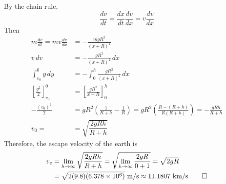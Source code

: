\begin{solution}
    By the chain rule,
    \[\frac{dv}{dt}=\frac{dx}{dt}\frac{dv}{dx}=v\frac{dv}{dx}\]
    Then
    \begin{align*}
        m\frac{dv}{dt}=mv\frac{dv}{dx} &= -\frac{mgR^2}{(x+R)^2} \\
        v\,dv &= -\frac{gR^2}{(x+R)^2}\,dx \\
        \int_{v_0}^0 y\,dy &= -\int_0^h \frac{gR^2}{(x+R)^2}\,dx \\
        \left[\frac{y^2}{2}\right]_{v_0}^0
        &= \left[\frac{gR^2}{x+R}\right]_0^h \\
        -\frac{(v_0)^2}{2} &= gR^2\left(\frac{1}{R+h}-\frac{1}{R}\right)
        =gR^2\left(\frac{R-(R+h)}{R(R+h)}\right)=-\frac{gRh}{R+h} \\
        v_0= &= \sqrt{\dfrac{2gRh}{R+h}}
    \end{align*}
    Therefore, the escape velocity of the earth is
    \begin{align*}
        v_e &= \lim_{h\to\infty}\sqrt{\dfrac{2gRh}{R+h}}
        =\sqrt{\lim_{h\to\infty}\frac{2gR}{0+1}}=\sqrt{2gR} \\
        &=\sqrt{2(9.8)(6.378\times10^6)}\ \text{m/s}
        \approx 11.1807\ \text{km/s} \qedhere
    \end{align*}
\end{solution}